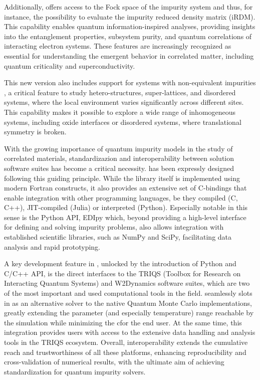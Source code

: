 \documentclass[edipack2.tex]{subfiles}
\begin{document}
Additionally, \NAME offers access to the Fock space of
the impurity system and thus, for instance, the possibility to
evaluate the impurity reduced density matrix
(iRDM). This capability enables quantum information-inspired analyses, providing insights into the entanglement properties, subsystem purity, and quantum correlations of interacting electron systems. These
features are increasingly recognized as essential for understanding the emergent behavior in correlated matter, including quantum criticality and superconductivity.

This new version also includes support for systems with non-equivalent impurities , a critical feature to study hetero-structures, super-lattices, and disordered systems, where the local environment varies significantly across different sites. This capability makes it 
possible to explore a wide range of inhomogeneous systems, including
oxide interfaces or disordered systems, where
translational symmetry is broken.


With the growing importance of  quantum impurity models in the study of correlated materials,
standardizazion and interoperability between solution software suites has
become a critical necessity.
\NAME has been expressly designed following this guiding principle. 
While the library itself is implemented using modern Fortran constructs, it also provides an extensive set of C-bindings that enable integration with other programming languages,
be they compiled (C, C++), JIT-compiled (Julia) or interpreted (Python). 
Especially notable in this sense is the Python API, EDIpy which, beyond providing a 
high-level interface for defining and solving impurity problems, also allows integration with established scientific libraries, such as NumPy and SciPy, facilitating data analysis and
rapid prototyping.

A key development feature in \NAME, unlocked by the introduction of Python and C/C++ API, 
is the direct  interfaces to the TRIQS (Toolbox for Research on Interacting Quantum Systems) and
W2Dynamics software suites, which are two of the most important and used computational tools in
the field. \NAME seamlessly slots in as an alternative solver to the native Quantum Monte Carlo 
implementations, greatly extending the parameter (and especially temperature) range reachable by 
the simulation while minimizing the cfor the end user.
At the same time, this integration provides \NAME users with access to the
extensive data handling and analysis tools in the TRIQS ecosystem. 
Overall, interoperability extends the cumulative reach and trustworthiness of all these platforms,
enhancing reproducibility and cross-validation of numerical results, with the ultimate aim of achieving standardization for quantum impurity solvers.
\end{document}
